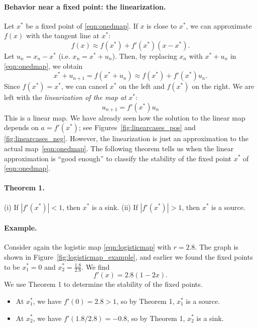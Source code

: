 \documentclass{book}
\begin{document}
\paragraph{Behavior near a fixed point: the linearization.}
Let $x^*$ be a fixed point of \eqref{eqn:onedmap}.
If $x$ is close to $x^*$,
we can approximate $f(x)$ with the tangent line at $x^*$:
\begin{equation}
   f(x) \approx f(x^*) + f'(x^*)(x-x^*).
\end{equation}
Let $u_n = x_n-x^*$ (i.e. $x_n = x^* + u_n$).
Then, by replacing $x_n$ with $x^*+u_n$
in \eqref{eqn:onedmap}, we obtain
\begin{equation}
  x^* + u_{n+1} = f(x^*+u_n) \approx f(x^*)+f'(x^*)u_n.
\end{equation}
Since $f(x^*)=x^*$, we can cancel $x^*$ on the left
and $f(x^*)$ on the right.
We are left with the
\emph{linearization of the map at } $x^*$:
\begin{equation}
  u_{n+1} = f'(x^*)u_n
\end{equation}
This is a linear map.
We have already seen how the solution to the linear
map depends on $a=f'(x^*)$; see Figures~\ref{fig:linearcases_pos}
and \ref{fig:linearcases_neg}.
However, the linearization is just an approximation
to the actual map~\eqref{eqn:onedmap}.
The following theorem tells us when the linear approximation
is ``good enough'' to classify the stability of the
fixed point $x^*$ of \eqref{eqn:onedmap}.

\paragraph{Theorem 1.}
(i) If $|f'(x^*)| < 1$, then $x^*$ is a sink.
(ii) If $|f'(x^*)| > 1$, then $x^*$ is a source.


\paragraph{Example.}
Consider again the logistic map \eqref{eqn:logisticmap}
with $r=2.8$.  The graph is shown in
Figure~\ref{fig:logisticmap_example}, and earlier we found the
fixed points to be $x^*_1=0$ and $x^*_2=\frac{1.8}{2.8}$.
We find
\begin{equation}
  f'(x) = 2.8(1-2x).
\end{equation}
We use Theorem 1 to determine the stability of the fixed points.
\begin{itemize}
\item
At $x^*_1$, we have $f'(0) = 2.8 > 1$, so by Theorem 1,
$x^*_1$ is a source.
\item
At $x^*_2$, we have $f'(1.8/2.8) = -0.8$,
so by Theorem 1,
$x^*_2$ is a sink.
\end{itemize}
\end{document}
